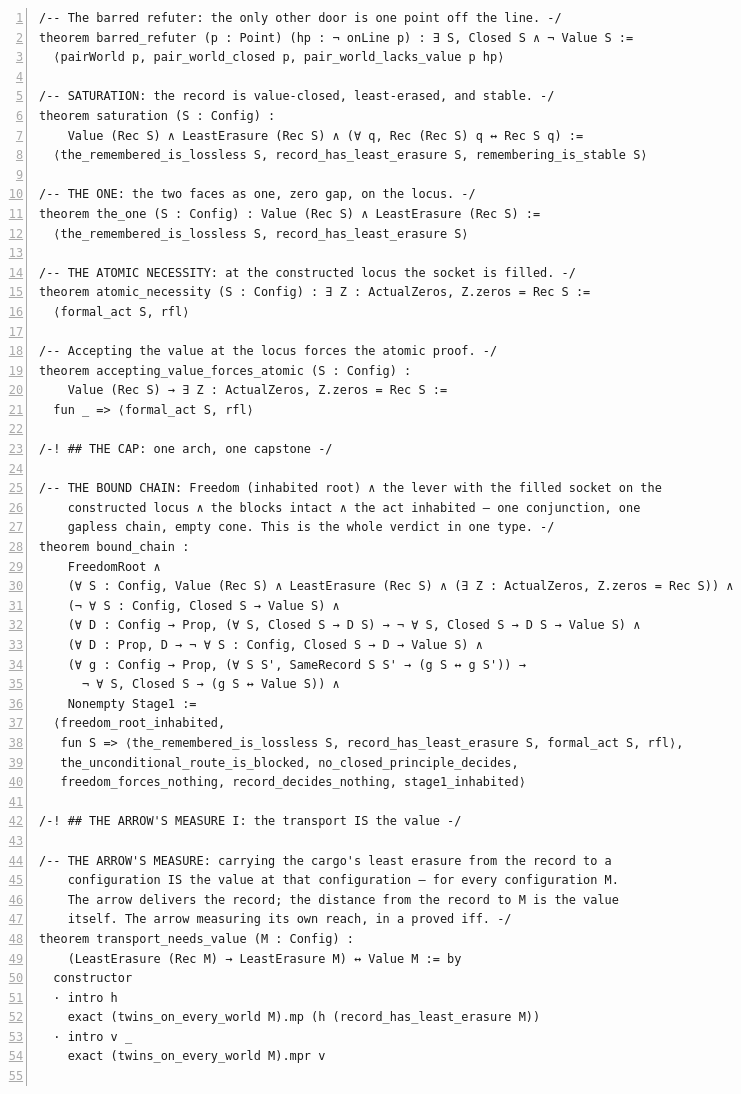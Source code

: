 \documentclass[10pt]{article}
\newcommand{\leansize}{\fontsize{5.5pt}{6.75pt}\selectfont}
\begin{document}
\begin{multicols}{2}
\begin{Verbatim}[numbers=left,firstnumber=1,numbersep=3pt,xleftmargin=2.6em,breaklines=true,breakanywhere=true,breakautoindent=false,breakindent=1.4em,breaksymbolleft={},breakanywheresymbolpre={},fontsize=\leansize]
/-- The barred refuter: the only other door is one point off the line. -/
theorem barred_refuter (p : Point) (hp : ¬ onLine p) : ∃ S, Closed S ∧ ¬ Value S :=
  ⟨pairWorld p, pair_world_closed p, pair_world_lacks_value p hp⟩

/-- SATURATION: the record is value-closed, least-erased, and stable. -/
theorem saturation (S : Config) :
    Value (Rec S) ∧ LeastErasure (Rec S) ∧ (∀ q, Rec (Rec S) q ↔ Rec S q) :=
  ⟨the_remembered_is_lossless S, record_has_least_erasure S, remembering_is_stable S⟩

/-- THE ONE: the two faces as one, zero gap, on the locus. -/
theorem the_one (S : Config) : Value (Rec S) ∧ LeastErasure (Rec S) :=
  ⟨the_remembered_is_lossless S, record_has_least_erasure S⟩

/-- THE ATOMIC NECESSITY: at the constructed locus the socket is filled. -/
theorem atomic_necessity (S : Config) : ∃ Z : ActualZeros, Z.zeros = Rec S :=
  ⟨formal_act S, rfl⟩

/-- Accepting the value at the locus forces the atomic proof. -/
theorem accepting_value_forces_atomic (S : Config) :
    Value (Rec S) → ∃ Z : ActualZeros, Z.zeros = Rec S :=
  fun _ => ⟨formal_act S, rfl⟩

/-! ## THE CAP: one arch, one capstone -/

/-- THE BOUND CHAIN: Freedom (inhabited root) ∧ the lever with the filled socket on the
    constructed locus ∧ the blocks intact ∧ the act inhabited — one conjunction, one
    gapless chain, empty cone. This is the whole verdict in one type. -/
theorem bound_chain :
    FreedomRoot ∧
    (∀ S : Config, Value (Rec S) ∧ LeastErasure (Rec S) ∧ (∃ Z : ActualZeros, Z.zeros = Rec S)) ∧
    (¬ ∀ S : Config, Closed S → Value S) ∧
    (∀ D : Config → Prop, (∀ S, Closed S → D S) → ¬ ∀ S, Closed S → D S → Value S) ∧
    (∀ D : Prop, D → ¬ ∀ S : Config, Closed S → D → Value S) ∧
    (∀ g : Config → Prop, (∀ S S', SameRecord S S' → (g S ↔ g S')) →
      ¬ ∀ S, Closed S → (g S ↔ Value S)) ∧
    Nonempty Stage1 :=
  ⟨freedom_root_inhabited,
   fun S => ⟨the_remembered_is_lossless S, record_has_least_erasure S, formal_act S, rfl⟩,
   the_unconditional_route_is_blocked, no_closed_principle_decides,
   freedom_forces_nothing, record_decides_nothing, stage1_inhabited⟩

/-! ## THE ARROW'S MEASURE I: the transport IS the value -/

/-- THE ARROW'S MEASURE: carrying the cargo's least erasure from the record to a
    configuration IS the value at that configuration — for every configuration M.
    The arrow delivers the record; the distance from the record to M is the value
    itself. The arrow measuring its own reach, in a proved iff. -/
theorem transport_needs_value (M : Config) :
    (LeastErasure (Rec M) → LeastErasure M) ↔ Value M := by
  constructor
  · intro h
    exact (twins_on_every_world M).mp (h (record_has_least_erasure M))
  · intro v _
    exact (twins_on_every_world M).mpr v


\end{Verbatim}
\end{multicols}
\end{document}
